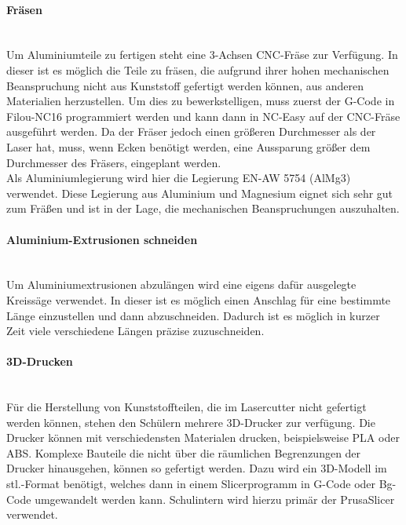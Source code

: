 \paragraph{Fräsen}\mbox{}\\
Um Aluminiumteile zu fertigen steht eine 3-Achsen CNC-Fräse zur Verfügung. In dieser ist es möglich die Teile zu fräsen, die aufgrund ihrer hohen mechanischen Beanspruchung nicht aus Kunststoff gefertigt werden können, aus anderen Materialien herzustellen. Um dies zu bewerkstelligen, muss zuerst der G-Code in Filou-NC16 programmiert werden und kann dann in NC-Easy auf der CNC-Fräse ausgeführt werden. Da der Fräser jedoch einen größeren Durchmesser als der Laser hat, muss, wenn Ecken benötigt werden, eine Aussparung größer dem Durchmesser des Fräsers, eingeplant werden.\\
Als Aluminiumlegierung wird hier die Legierung EN-AW 5754 (AlMg3) verwendet. Diese Legierung aus Aluminium und Magnesium eignet sich sehr gut zum Fräßen und ist in der Lage, die mechanischen Beanspruchungen auszuhalten.

\paragraph{Aluminium-Extrusionen schneiden}\mbox{}\\
Um Aluminiumextrusionen abzulängen wird eine eigens dafür ausgelegte Kreissäge verwendet. In dieser ist es möglich einen Anschlag für eine bestimmte Länge einzustellen und dann abzuschneiden. Dadurch ist es möglich in kurzer Zeit viele verschiedene Längen präzise zuzuschneiden. 

\paragraph{3D-Drucken}\mbox{}\\
Für die Herstellung von Kunststoffteilen, die im Lasercutter nicht gefertigt werden können, stehen den Schülern mehrere 3D-Drucker zur verfügung. Die Drucker können mit verschiedensten Materialen drucken, beispielsweise PLA oder ABS. Komplexe Bauteile die nicht über die räumlichen Begrenzungen der Drucker hinausgehen, können so gefertigt werden. Dazu wird ein 3D-Modell im stl.-Format benötigt, welches dann in einem Slicerprogramm in G-Code oder Bg-Code umgewandelt werden kann\cite{How_to_PrusaSlicer}. Schulintern wird hierzu primär der PrusaSlicer verwendet.

